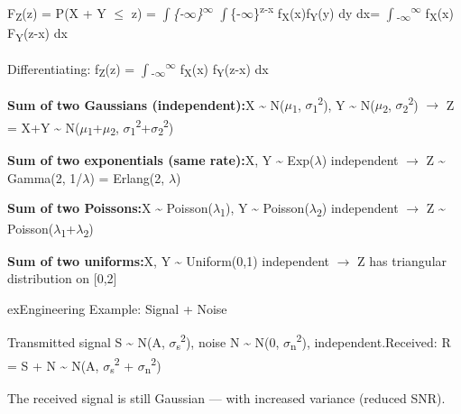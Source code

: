 
F\textsubscript{Z}(z) = P(X + Y \ensuremath{\le} z) = \ensuremath{\int}\emph{\{-\ensuremath{\infty}\}\textsuperscript{\ensuremath{\infty}} \ensuremath{\int}}\{-\ensuremath{\infty}\}\textsuperscript{z-x} f\textsubscript{X}(x)f\textsubscript{Y}(y) dy dx\PSbr{}= \ensuremath{\int}\textsubscript{-\ensuremath{\infty}}\textsuperscript{\ensuremath{\infty}} f\textsubscript{X}(x) F\textsubscript{Y}(z-x) dx

Differentiating: f\textsubscript{Z}(z) = \ensuremath{\int}\textsubscript{-\ensuremath{\infty}}\textsuperscript{\ensuremath{\infty}} f\textsubscript{X}(x) f\textsubscript{Y}(z-x) dx \PSyes{}


\textbf{Sum of two Gaussians (independent):}\PSbr{}X \textasciitilde{} N(\ensuremath{\mu}\textsubscript{1}, \ensuremath{\sigma}\textsubscript{1}\textsuperscript{2}), Y \textasciitilde{} N(\ensuremath{\mu}\textsubscript{2}, \ensuremath{\sigma}\textsubscript{2}\textsuperscript{2}) \ensuremath{\to} Z = X+Y \textasciitilde{} N(\ensuremath{\mu}\textsubscript{1}+\ensuremath{\mu}\textsubscript{2}, \ensuremath{\sigma}\textsubscript{1}\textsuperscript{2}+\ensuremath{\sigma}\textsubscript{2}\textsuperscript{2})

\textbf{Sum of two exponentials (same rate):}\PSbr{}X, Y \textasciitilde{} Exp(\ensuremath{\lambda}) independent \ensuremath{\to} Z \textasciitilde{} Gamma(2, 1/\ensuremath{\lambda}) = Erlang(2, \ensuremath{\lambda})

\textbf{Sum of two Poissons:}\PSbr{}X \textasciitilde{} Poisson(\ensuremath{\lambda}\textsubscript{1}), Y \textasciitilde{} Poisson(\ensuremath{\lambda}\textsubscript{2}) independent \ensuremath{\to} Z \textasciitilde{} Poisson(\ensuremath{\lambda}\textsubscript{1}+\ensuremath{\lambda}\textsubscript{2})

\textbf{Sum of two uniforms:}\PSbr{}X, Y \textasciitilde{} Uniform(0,1) independent \ensuremath{\to} Z has triangular distribution on [0,2]

\begin{PSbox}[unbreakable]{ex}{Engineering Example: Signal + Noise}

Transmitted signal S \textasciitilde{} N(A, \ensuremath{\sigma}\textsubscript{s}\textsuperscript{2}), noise N \textasciitilde{} N(0, \ensuremath{\sigma}\textsubscript{n}\textsuperscript{2}), independent.\PSbr{}Received: R = S + N \textasciitilde{} N(A, \ensuremath{\sigma}\textsubscript{s}\textsuperscript{2} + \ensuremath{\sigma}\textsubscript{n}\textsuperscript{2})

The received signal is still Gaussian — with increased variance (reduced SNR).

\end{PSbox}

